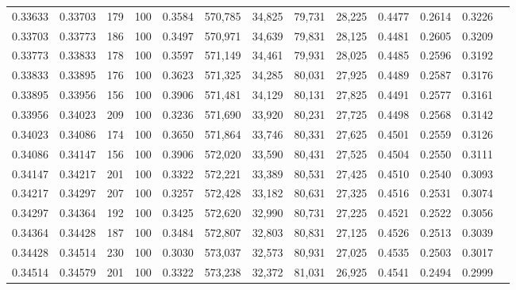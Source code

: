\begin{tabular}{rrrrrrrrrrrrr}
0.33633 & 0.33703 &   179 & 100 &                                     0.3584 & 570,785 &  34,825 &  79,731 &  28,225 & 0.4477 & 0.2614 & 0.3226 \\
0.33703 & 0.33773 &   186 & 100 &                                     0.3497 & 570,971 &  34,639 &  79,831 &  28,125 & 0.4481 & 0.2605 & 0.3209 \\
0.33773 & 0.33833 &   178 & 100 &                                     0.3597 & 571,149 &  34,461 &  79,931 &  28,025 & 0.4485 & 0.2596 & 0.3192 \\
0.33833 & 0.33895 &   176 & 100 &                                     0.3623 & 571,325 &  34,285 &  80,031 &  27,925 & 0.4489 & 0.2587 & 0.3176 \\
0.33895 & 0.33956 &   156 & 100 &                                     0.3906 & 571,481 &  34,129 &  80,131 &  27,825 & 0.4491 & 0.2577 & 0.3161 \\
0.33956 & 0.34023 &   209 & 100 &                                     0.3236 & 571,690 &  33,920 &  80,231 &  27,725 & 0.4498 & 0.2568 & 0.3142 \\
0.34023 & 0.34086 &   174 & 100 &                                     0.3650 & 571,864 &  33,746 &  80,331 &  27,625 & 0.4501 & 0.2559 & 0.3126 \\
0.34086 & 0.34147 &   156 & 100 &                                     0.3906 & 572,020 &  33,590 &  80,431 &  27,525 & 0.4504 & 0.2550 & 0.3111 \\
0.34147 & 0.34217 &   201 & 100 &                                     0.3322 & 572,221 &  33,389 &  80,531 &  27,425 & 0.4510 & 0.2540 & 0.3093 \\
0.34217 & 0.34297 &   207 & 100 &                                     0.3257 & 572,428 &  33,182 &  80,631 &  27,325 & 0.4516 & 0.2531 & 0.3074 \\
0.34297 & 0.34364 &   192 & 100 &                                     0.3425 & 572,620 &  32,990 &  80,731 &  27,225 & 0.4521 & 0.2522 & 0.3056 \\
0.34364 & 0.34428 &   187 & 100 &                                     0.3484 & 572,807 &  32,803 &  80,831 &  27,125 & 0.4526 & 0.2513 & 0.3039 \\
0.34428 & 0.34514 &   230 & 100 &                                     0.3030 & 573,037 &  32,573 &  80,931 &  27,025 & 0.4535 & 0.2503 & 0.3017 \\
0.34514 & 0.34579 &   201 & 100 &                                     0.3322 & 573,238 &  32,372 &  81,031 &  26,925 & 0.4541 & 0.2494 & 0.2999 \\

\end{tabular}
